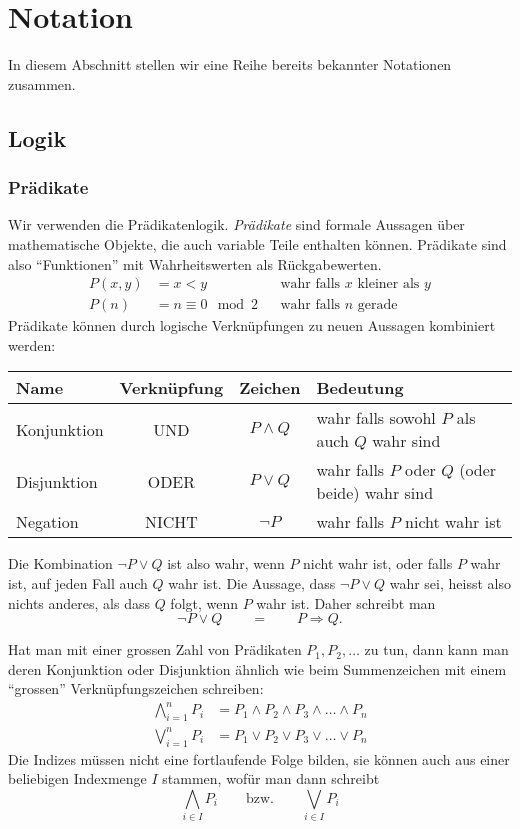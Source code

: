 %
%
%
\section{Notation}
In diesem Abschnitt stellen wir eine Reihe bereits bekannter Notationen
zusammen.
\subsection{Logik}
%
%
\subsubsection{Prädikate}
Wir verwenden die Prädikatenlogik.
%
{\em Prädikate} sind formale Aussagen über mathematische Objekte, die auch
variable Teile enthalten können.
Prädikate sind also ``Funktionen'' mit
Wahrheitswerten als Rückgabewerten.
\begin{align*}
P(x,y)&=x < y&&\text{wahr falls $x$ kleiner als $y$}\\
P(n)&=n \equiv 0\mod 2&&\text{wahr falls $n$ gerade}
\end{align*}
Prädikate können durch logische Verknüpfungen zu neuen Aussagen kombiniert
werden:
\begin{center}
\begin{tabular}{|l|c|c|l|}
\hline
Name&Verknüpfung&Zeichen&Bedeutung\\
\hline
\index{Konjunktion}%
Konjunktion&UND&$P\wedge Q$&wahr falls sowohl $P$ als auch $Q$ wahr sind\\
\index{Disjunktion}%
Disjunktion&ODER&$P\vee Q$&wahr falls $P$ oder $Q$ (oder beide) wahr sind\\
\index{Negation}%
Negation&NICHT&$\neg P$&wahr falls $P$ nicht wahr ist\\
\hline
\end{tabular}
\end{center}
Die Kombination $\neg P\vee Q$ ist also wahr, wenn $P$ nicht
wahr ist, oder falls $P$ wahr ist, auf jeden Fall auch $Q$
wahr ist.
Die Aussage, dass $\neg P\vee Q$ wahr sei, heisst also
nichts anderes, als dass $Q$ folgt, wenn $P$ wahr ist.
Daher schreibt man
\[
\neg P\vee Q\qquad =\qquad P\Rightarrow Q.
\]

Hat man mit einer grossen Zahl von Prädikaten $P_1,P_2,\dots$ zu tun,
dann kann man deren Konjunktion oder Disjunktion ähnlich wie beim Summenzeichen
mit einem ``grossen'' Verknüpfungszeichen schreiben:
\begin{align*}
\bigwedge_{i=1}^n P_i&=P_1\wedge P_2\wedge P_3\wedge\dots\wedge P_n\\
\bigvee_{i=1}^n P_i&=P_1\vee P_2\vee P_3\vee\dots\vee P_n
\end{align*}
Die Indizes müssen nicht eine fortlaufende Folge bilden, sie können
auch aus einer beliebigen Indexmenge $I$ stammen, wofür man dann
schreibt
\[
\bigwedge_{i\in I}P_i
\qquad
\text{bzw.}
\qquad
\bigvee_{i\in I}P_i
\]

